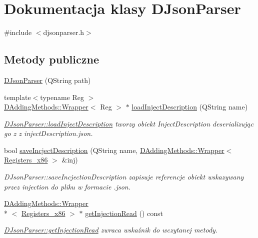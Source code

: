 \hypertarget{class_d_json_parser}{\section{Dokumentacja klasy D\-Json\-Parser}
\label{class_d_json_parser}
}


{\ttfamily \#include $<$djsonparser.\-h$>$}

\subsection*{Metody publiczne}
\begin{DoxyCompactItemize}
\item 
\hyperlink{class_d_json_parser_ab1d4f6d9c863888595a4d4568114b7b4}{D\-Json\-Parser} (Q\-String path)
\item 
{\footnotesize template$<$typename Reg $>$ }\\\hyperlink{class_d_adding_methods_1_1_wrapper}{D\-Adding\-Methods\-::\-Wrapper}$<$ Reg $>$ $\ast$ \hyperlink{class_d_json_parser_a3baa4948e78cb386c8eb7e6634ab4d03}{load\-Inject\-Description} (Q\-String name)
\begin{DoxyCompactList}\small\item\em \hyperlink{class_d_json_parser_a3baa4948e78cb386c8eb7e6634ab4d03}{D\-Json\-Parser\-::load\-Inject\-Description} tworzy obiekt Inject\-Description deserializując go z z inject\-Description.\-json. \end{DoxyCompactList}\item 
bool \hyperlink{class_d_json_parser_a6d680ce58c2e6b638223071d996a2c0f}{save\-Incject\-Description} (Q\-String name, \hyperlink{class_d_adding_methods_1_1_wrapper}{D\-Adding\-Methods\-::\-Wrapper}$<$ \hyperlink{codedefines_8h_a0f84efe4ca4d99203713a78bd6e8c82e}{Registers\-\_\-x86} $>$ \&inj)
\begin{DoxyCompactList}\small\item\em D\-Json\-Parser\-::save\-Incjection\-Description zapisuje referencje obiekt wskazywany przez injection do pliku w formacie .json. \end{DoxyCompactList}\item 
\hyperlink{class_d_adding_methods_1_1_wrapper}{D\-Adding\-Methods\-::\-Wrapper}\\*
$<$ \hyperlink{codedefines_8h_a0f84efe4ca4d99203713a78bd6e8c82e}{Registers\-\_\-x86} $>$ $\ast$ \hyperlink{class_d_json_parser_a0603bac0338a1ae401b3f58cfc1d67c9}{get\-Injection\-Read} () const 
\begin{DoxyCompactList}\small\item\em \hyperlink{class_d_json_parser_a0603bac0338a1ae401b3f58cfc1d67c9}{D\-Json\-Parser\-::get\-Injection\-Read} zwraca wskaźnik do wczytanej metody. \end{DoxyCompactList}\end{DoxyCompactItemize}


